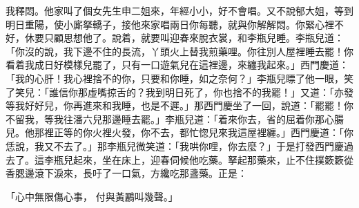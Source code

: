 我釋悶。他家叫了個女先生申二姐來，年經小小，好不會唱。又不說郁大姐，等到明日重陽，使小廝拏轎子，接他來家唱兩日你每聽，就與你解解悶。你緊心裡不好，休要只顧思想他了。說着，就要叫迎春來脫衣裳，和李瓶兒睡。李瓶兒道：「你沒的說，我下邊不住的長流，丫頭火上替我煎藥哩。你往別人屋裡睡去罷！你看着我成日好模樣兒罷了，只有一口遊氣兒在這裡邊，來纏我起來。」西門慶道：「我的心肝！我心裡捨不的你，只要和你睡，如之奈何？」李瓶兒瞟了他一眼，笑了笑兒：「誰信你那虛嘴掠舌的？我到明日死了，你也捨不的我罷！」又道：「亦發等我好好兒，你再進來和我睡，也是不遲。」那西門慶坐了一回，說道：「罷罷！你不留我，等我往潘六兒那邊睡去罷。」李瓶兒道：「着來你去，省的屈着你那心腸兒。他那裡正等的你火裡火發，你不去，都忙惚兒來我這屋裡纏。」西門慶道：「你恁說，我又不去了。」那李瓶兒微笑道：「我哄你哩，你去麼？」于是打發西門慶過去了。這李瓶兒起來，坐在床上，迎春伺候他吃藥。拏起那藥來，止不住撲簌簌從香腮邊滾下淚來，長吁了一口氣，方纔吃那盞藥。正是：

「心中無限傷心事，  付與黃鸝叫幾聲。」


